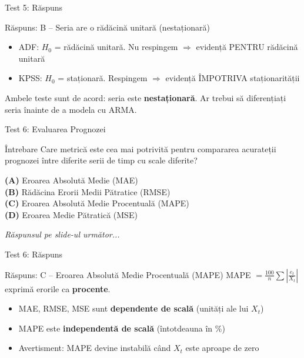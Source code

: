\documentclass[9pt, aspectratio=169, t]{beamer}
\begin{document}
\begin{frame}{Test 5: Răspuns}
    \begin{exampleblock}{Răspuns: B -- Seria are o rădăcină unitară (nestaționară)}
        \begin{itemize}
            \item ADF: $H_0$ = rădăcină unitară. Nu respingem $\Rightarrow$ evidență PENTRU rădăcină unitară
            \item KPSS: $H_0$ = staționară. Respingem $\Rightarrow$ evidență ÎMPOTRIVA staționarității
        \end{itemize}
        Ambele teste sunt de acord: seria este \textbf{nestaționară}. Ar trebui să diferențiați seria înainte de a modela cu ARMA.
    \end{exampleblock}
\end{frame}

\begin{frame}{Test 6: Evaluarea Prognozei}
    \begin{alertblock}{Întrebare}
        Care metrică este cea mai potrivită pentru compararea acurateții prognozei între diferite serii de timp cu scale diferite?
    \end{alertblock}

    \vspace{0.4cm}

    \textcolor{MainBlue}{\textbf{(A)}} Eroarea Absolută Medie (MAE)\\[3pt]
    \textcolor{MainBlue}{\textbf{(B)}} Rădăcina Erorii Medii Pătratice (RMSE)\\[3pt]
    \textcolor{MainBlue}{\textbf{(C)}} Eroarea Absolută Medie Procentuală (MAPE)\\[3pt]
    \textcolor{MainBlue}{\textbf{(D)}} Eroarea Medie Pătratică (MSE)

    \vspace{0.5cm}

    \begin{center}
        \textit{Răspunsul pe slide-ul următor...}
    \end{center}
\end{frame}

\begin{frame}{Test 6: Răspuns}
    \begin{exampleblock}{Răspuns: C -- Eroarea Absolută Medie Procentuală (MAPE)}
        MAPE $= \frac{100}{n}\sum\left|\frac{e_t}{X_t}\right|$ exprimă erorile ca \textbf{procente}.

        \begin{itemize}
            \item MAE, RMSE, MSE sunt \textbf{dependente de scală} (unități ale lui $X_t$)
            \item MAPE este \textbf{independentă de scală} (întotdeauna în \%)
            \item Avertisment: MAPE devine instabilă când $X_t$ este aproape de zero
        \end{itemize}
    \end{exampleblock}
\end{frame}
\end{document}
